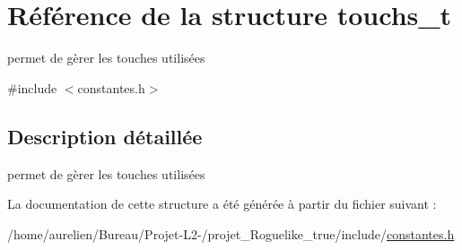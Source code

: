 \hypertarget{structtouchs__t}{}\section{Référence de la structure touchs\+\_\+t}
\label{structtouchs__t}


permet de gèrer les touches utilisées  




{\ttfamily \#include $<$constantes.\+h$>$}



\subsection{Description détaillée}
permet de gèrer les touches utilisées 

La documentation de cette structure a été générée à partir du fichier suivant \+:\begin{DoxyCompactItemize}
\item 
/home/aurelien/\+Bureau/\+Projet-\/\+L2-\//projet\+\_\+\+Roguelike\+\_\+true/include/\hyperlink{constantes_8h}{constantes.\+h}\end{DoxyCompactItemize}
